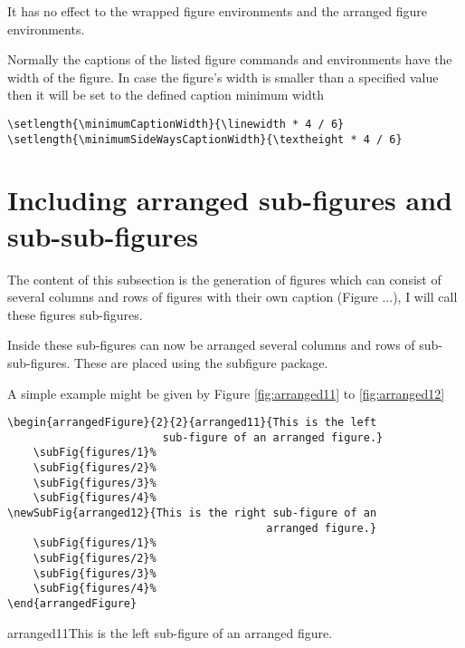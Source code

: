 \documentclass[12pt,a4paper]{article}
\begin{document}
It has no effect to the wrapped figure environments and the arranged figure environments.

Normally the captions of the listed figure commands and environments have the 
width of the figure. In case the figure's width is smaller than a specified value 
then it will be set to the defined caption minimum width 

\begin{verbatim}
\setlength{\minimumCaptionWidth}{\linewidth * 4 / 6}
\setlength{\minimumSideWaysCaptionWidth}{\textheight * 4 / 6}
\end{verbatim}



\clearpage








\section{Including arranged sub-figures and sub-sub-figures}


The content of this subsection is the generation of figures which can
consist of several columns and rows of figures with their own caption 
(Figure ...), I will call these figures sub-figures.

Inside these sub-figures can now be arranged several columns and rows of 
sub-sub-figures. These are placed using the subfigure package.

A simple example might be given by Figure \ref{fig:arranged11} to \ref{fig:arranged12}

\begin{verbatim}
\begin{arrangedFigure}{2}{2}{arranged11}{This is the left 
                        sub-figure of an arranged figure.}
    \subFig{figures/1}%
    \subFig{figures/2}%
    \subFig{figures/3}%
    \subFig{figures/4}%
\newSubFig{arranged12}{This is the right sub-figure of an 
                                        arranged figure.}
    \subFig{figures/1}%
    \subFig{figures/2}%
    \subFig{figures/3}%
    \subFig{figures/4}%
\end{arrangedFigure}
\end{verbatim}

\begin{arrangedFigure}{2}{2}{arranged11}{This is the left sub-figure of an arranged figure.}
\end{arrangedFigure}
\end{document}
